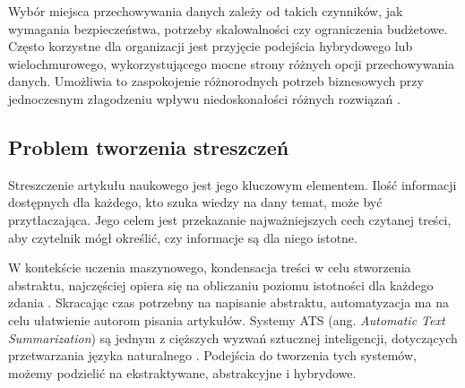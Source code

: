 \documentclass[12pt,a4paper,twoside]{article}
\begin{document}
Wybór miejsca przechowywania danych zależy od takich czynników, jak wymagania bezpieczeństwa, potrzeby skalowalności czy ograniczenia budżetowe. Często korzystne dla organizacji jest przyjęcie podejścia hybrydowego lub wielochmurowego, wykorzystującego mocne strony różnych opcji przechowywania danych. Umożliwia to zaspokojenie różnorodnych potrzeb biznesowych przy jednoczesnym złagodzeniu wpływu niedoskonałości różnych rozwiązań \cite{Ho2022}.

\subsection{Problem tworzenia streszczeń}
Streszczenie artykułu naukowego jest jego kluczowym elementem. Ilość informacji dostępnych dla każdego, kto szuka wiedzy na dany temat, może być przytłaczająca. Jego celem jest przekazanie najważniejszych cech czytanej treści, aby czytelnik mógł określić, czy informacje są dla niego istotne. \par
W kontekście uczenia maszynowego, kondensacja treści w celu stworzenia abstraktu, najczęściej opiera się na obliczaniu poziomu istotności dla każdego zdania \cite{MUTLU2020102359}. Skracając czas potrzebny na napisanie abstraktu, automatyzacja ma na celu ułatwienie autorom pisania artykułów. Systemy ATS (ang. \textit{Automatic Text Summarization}) są jednym z cięższych wyzwań sztucznej inteligencji, dotyczących przetwarzania języka naturalnego \cite{ELKASSAS2021113679}. Podejścia do tworzenia tych systemów, możemy podzielić na ekstraktywane, abstrakcyjne i hybrydowe. 
\end{document}
